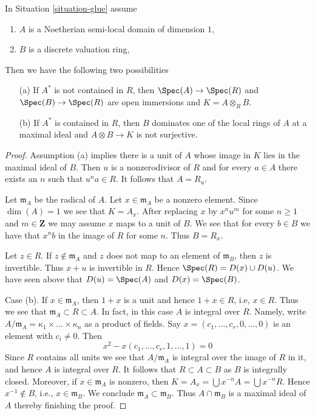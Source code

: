 \begin{lemma}
\label{lemma-semi-local}
In Situation \ref{situation-glue} assume
\begin{enumerate}
\item $A$ is a Noetherian semi-local domain of dimension $1$,
\item $B$ is a discrete valuation ring,
\end{enumerate}
Then we have the following two possibilities
\begin{enumerate}
\item[(a)] If $A^*$ is not contained in $R$, then
$\Spec(A) \to \Spec(R)$ and $\Spec(B) \to \Spec(R)$
are open immersions and $K = A \otimes_R B$.
\item[(b)] If $A^*$ is contained in $R$, then $B$ dominates one of
the local rings of $A$ at a maximal ideal and $A \otimes B \to K$
is not surjective.
\end{enumerate}
\end{lemma}

\begin{proof}
Assumption (a) implies there is a unit of $A$ whose image in $K$ lies in
the maximal ideal of $B$. Then $u$ is a nonzerodivisor of $R$ and for
every $a \in A$ there exists an $n$ such that $u^n a \in R$. It follows
that $A = R_u$.

\medskip\noindent
Let $\mathfrak m_A$ be the radical of $A$. Let $x \in \mathfrak m_A$
be a nonzero element. Since $\dim(A) = 1$ we see that $K = A_x$.
After replacing $x$ by $x^n u^m$ for some $n \geq 1$ and
$m \in \mathbf{Z}$ we may assume $x$ maps to a unit of $B$.
We see that for every $b \in B$ we have that $x^nb$
in the image of $R$ for some $n$. Thus $B = R_x$.

\medskip\noindent
Let $z \in R$. If $z \not \in \mathfrak m_A$ and $z$ does not map to
an element of $\mathfrak m_B$, then $z$ is invertible.
Thus $x + u$ is invertible in $R$. Hence $\Spec(R) = D(x) \cup D(u)$.
We have seen above that $D(u) = \Spec(A)$ and $D(x) = \Spec(B)$.

\medskip\noindent
Case (b). If $x \in \mathfrak m_A$, then $1 + x$ is a unit and
hence $1 + x \in R$, i.e, $x \in R$. Thus we see that
$\mathfrak m_A \subset R \subset A$. In fact, in this case
$A$ is integral over $R$. Namely, write
$A/\mathfrak m_A = \kappa_1 \times \ldots \times \kappa_n$
as a product of fields. Say $x = (c_1, \ldots, c_r, 0, \ldots, 0)$
is an element with $c_i \not = 0$. Then
$$
x^2 - x(c_1, \ldots, c_r, 1, \ldots, 1)  = 0
$$
Since $R$ contains all units we see that $A/\mathfrak m_A$ is
integral over the image of $R$ in it, and hence $A$ is integral over $R$.
It follows that $R \subset A \subset B$ as $B$ is integrally closed.
Moreover, if $x \in \mathfrak m_A$ is nonzero, then
$K = A_x = \bigcup x^{-n}A = \bigcup x^{-n}R$.
Hence $x^{-1} \not \in B$, i.e., $x \in \mathfrak m_B$.
We conclude $\mathfrak m_A \subset \mathfrak m_B$.
Thus $A \cap \mathfrak m_B$ is a maximal ideal of $A$ thereby
finishing the proof.
\end{proof}

